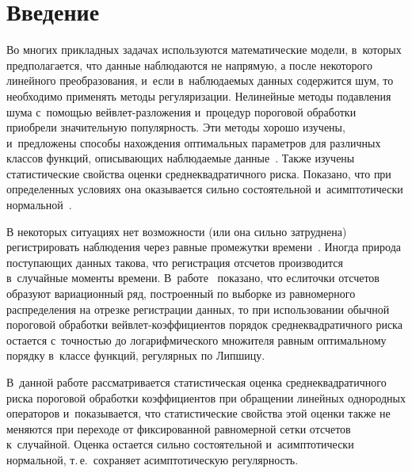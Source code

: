 
  
\vspace*{-3pt}



\thispagestyle{headings}

\begin{multicols}{2}

\label{st\stat}


\section{Введение}

Во многих прикладных задачах используются математические модели, в~которых предполагается, 
что данные наблюдаются не напрямую, а после некоторого линейного преобразования, 
и~если в~наблюдаемых данных содержится шум, то необходимо применять методы регуляризации. 
Нелинейные методы подавления шума с~помощью вейв\-лет-раз\-ло\-же\-ния и~процедур пороговой обработки приобрели 
значительную популярность. Эти методы хорошо изучены, и~предложены способы нахождения 
оптимальных параметров для различных классов функций, описывающих наблюдаемые данные~\cite{D94, Lee97, AS98, J99}. 
Также изучены статистические свойства оценки среднеквадратичного риска. 
Показано, что при определенных условиях она оказывается сильно состоятельной 
и~асимптотически нормальной~\cite{KS11-1, ESH14-1, EKS15}.

В некоторых ситуациях нет возможности (или она сильно затруднена) регистрировать 
наблюдения через равные промежутки времени~\cite{CB98}. Иногда природа поступающих данных 
такова, что ре\-гист\-ра\-ция отсчетов производится в~случайные моменты времени. 
В~работе~\cite{CB99} показано, что если\linebreak точки отсчетов образуют вариационный ряд, 
построенный по выборке из равномерного распределения на отрезке 
регистрации данных, то при использовании обычной пороговой 
обработки вейвлет-коэффициентов порядок среднеквадратичного 
риска остается с~точностью до логарифмического множителя 
равным оптимальному порядку в~классе функций, регулярных по Липшицу. 

В~данной работе рассматривается статистическая оценка 
среднеквадратичного риска пороговой обработки коэффициентов 
при обращении линейных однородных операторов и~показывается, 
что статистические свойства этой оценки также не меняются 
при переходе от фиксированной равномерной сетки отсчетов 
к~случайной. Оценка остается сильно состоятельной и~асимптотически 
нормальной, т.\,е.\ сохраняет асимптотическую регулярность.


\end{multicols}
